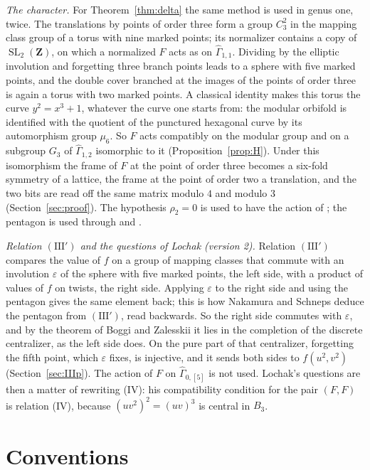 \documentclass[11pt,a4paper]{article}
\theoremstyle{plain}
\theoremstyle{definition}
\theoremstyle{remark}
\newcommand{\Z}{\mathbf Z}
\newcommand{\Gh}{\widehat\Gamma}
\newcommand{\SL}{\operatorname{SL}}
\begin{document}
\emph{The character.} For Theorem~\ref{thm:delta} the same method is used in genus one, twice. The translations by
points of order three form a group $C_3^2$ in the mapping class group of a torus with nine marked points; its
normalizer contains a copy of $\SL_2(\Z)$, on which a normalized $F$ acts as on $\Gh_{1,1}$. Dividing by the
elliptic involution and forgetting three branch points leads to a sphere with five marked points, and the double
cover branched at the images of the points of order three is again a torus with two marked points. A classical
identity makes this torus the curve $y^2=x^3+1$, whatever the curve one starts from: the modular orbifold is
identified with the quotient of the punctured hexagonal curve by its automorphism group $\mu_6$. So $F$ acts
compatibly on the modular group and on a subgroup $G_3$ of $\Gh_{1,2}$ isomorphic to it
(Proposition~\ref{prop:H}). Under this isomorphism the frame of $F$ at the point of order three becomes a
six-fold symmetry of a lattice, the frame at the point of order two a translation, and the two bits are read off
the same matrix modulo $4$ and modulo $3$ (Section~\ref{sec:proof}). The hypothesis $\rho_2=0$ is used to have the
action of \cite{HLS}; the pentagon is used through \cite{HLS} and \cite{HMM}.

\emph{Relation $(\mathrm{III}')$ and the questions of Lochak (version 2).} Relation $(\mathrm{III}')$ compares the
value of $f$ on a group of mapping classes that commute with an involution $\varepsilon$ of the sphere with five
marked points, the left side, with a product of values of $f$ on twists, the right side. Applying $\varepsilon$ to
the right side and using the pentagon gives the same element back; this is how Nakamura and Schneps deduce the
pentagon from $(\mathrm{III}')$, read backwards. So the right side commutes with $\varepsilon$, and by the theorem of
Boggi and Zalesskii it lies in the completion of the discrete centralizer, as the left side does. On the pure part
of that centralizer, forgetting the fifth point, which $\varepsilon$ fixes, is injective, and it sends both sides to
$f(u^2,v^2)$ (Section~\ref{sec:IIIp}). The action of $F$ on $\Gh_{0,[5]}$ is not used. Lochak's questions are then
a matter of rewriting (IV): his compatibility condition for the pair $(F,F)$ is relation (IV), because
$(uv^2)^2=(uv)^3$ is central in $B_3$.

\section{Conventions}\label{sec:conv}
\end{document}
